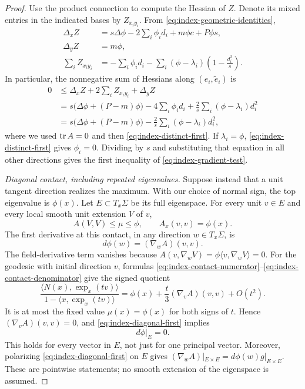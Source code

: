 \begin{proof}
Use the product connection to compute the Hessian of $Z$.  Denote its
mixed entries in the indicated bases by $Z_{x_i y_i}$.  From
\eqref{eq:index-geometric-identities},
\begin{align*}
 \Delta_x Z
   &=s\Delta\phi-2\sum_i\phi_i d_i+m\phi c+P\phi s,\\
 \Delta_y Z&=m\phi,\\
 \sum_i Z_{x_i y_i}
   &=-\sum_i\phi_i d_i
     -\sum_i(\phi-\lambda_i)
                         \left(1-\frac{d_i^2}{s}\right).
\end{align*}
In particular, the nonnegative sum of Hessians along
$(e_i,\widetilde e_i)$ is
\begin{align*}
 0&\le\Delta_xZ+2\sum_iZ_{x_i y_i}+\Delta_yZ\\
  &=s\bigl(\Delta\phi+(P-m)\phi\bigr)
       -4\sum_i\phi_i d_i
       +\frac{2}{s}\sum_i(\phi-\lambda_i)d_i^2\\
  &=s\bigl(\Delta\phi+(P-m)\phi\bigr)
       -\frac{2}{s}\sum_i(\phi-\lambda_i)d_i^2,
\end{align*}
where we used $\operatorname{tr} A=0$ and then
\eqref{eq:index-distinct-first}.  If $\lambda_i=\phi$,
\eqref{eq:index-distinct-first} gives $\phi_i=0$.  Dividing by $s$ and
substituting that equation in all other directions gives the first
inequality of \eqref{eq:index-gradient-test}.

\smallskip
\noindent\emph{Diagonal contact, including repeated eigenvalues.}
Suppose instead that a unit tangent direction realizes the maximum.
With our choice of normal sign, the top eigenvalue is $\phi(x)$.
Let $E\subset T_x\Sigma$ be its full eigenspace.  For every unit $v\in E$
and every local smooth unit extension $V$ of $v$,
\[
 A(V,V)\le\mu\le\phi,
 \qquad A_x(v,v)=\phi(x).
\]
The first derivative at this contact, in any direction $w\in T_x\Sigma$,
is
\begin{equation}\label{eq:index-diagonal-first}
 d\phi(w)=(\nabla_wA)(v,v).
\end{equation}
The field-derivative term vanishes because
$A(v,\nabla_wV)=\phi\langle v,\nabla_wV\rangle=0$.
For the geodesic with initial direction $v$, formulas
\eqref{eq:index-contact-numerator}--\eqref{eq:index-contact-denominator}
give the signed quotient
\[
 \frac{\langle N(x),\exp_x(tv)\rangle}
      {1-\langle x,\exp_x(tv)\rangle}
 =\phi(x)+\frac{t}{3}(\nabla_vA)(v,v)+O(t^2).
\]
It is at most the fixed value $\mu(x)=\phi(x)$ for both signs of $t$.
Hence $(\nabla_vA)(v,v)=0$, and
\eqref{eq:index-diagonal-first} implies
\begin{equation}\label{eq:index-top-gradient}
 d\phi|_E=0.
\end{equation}
This holds for every vector in $E$, not just for one principal vector.
Moreover, polarizing \eqref{eq:index-diagonal-first} on $E$ gives
$(\nabla_wA)|_{E\times E}=d\phi(w)g|_{E\times E}$.
These are pointwise statements; no smooth extension of the eigenspace
is assumed.


\end{proof}
